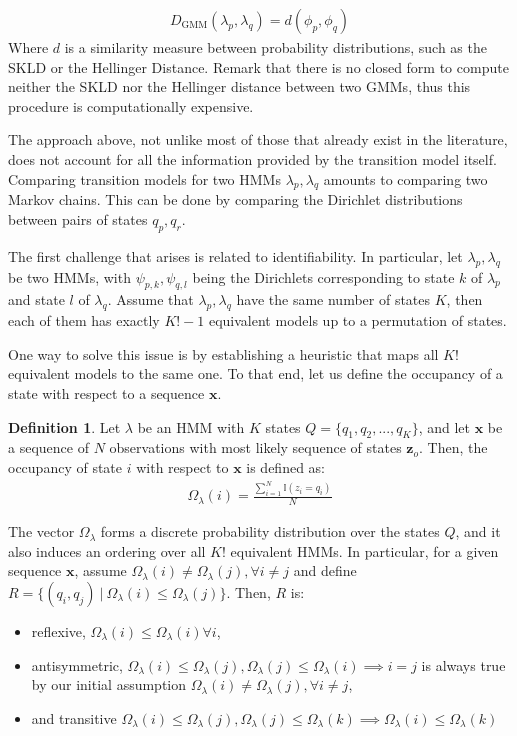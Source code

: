 \documentclass[pdftex,11pt,a4paper]{article}
\theoremstyle{definition}
\newtheorem{definition}{Definition}[section]
\theoremstyle{remark}
\newcommand*{\V}[1]{\mathbf{#1}}%
\newcommand\given[1][]{\:#1\vert\:}
\begin{document}
\begin{align*}
D_{\text{GMM}}(\lambda_p, \lambda_q) = d( \phi_p, \phi_q )
\end{align*}
Where $d$ is a similarity measure between probability distributions, such as the SKLD or the Hellinger Distance. Remark that there is no closed form to compute neither the SKLD nor the Hellinger distance between two GMMs, thus this procedure is computationally expensive.
\par The approach above, not unlike most of those that already exist in the literature, does not account for all the information provided by the transition model itself. Comparing transition models for two HMMs $\lambda_p, \lambda_q$ amounts to comparing two Markov chains. This can be done by comparing the Dirichlet distributions between pairs of states $q_p, q_r$. 
\par The first challenge that arises is related to identifiability. In particular, let $\lambda_p, \lambda_q$ be two HMMs, with $\psi_{p, k}, \psi_{q, l}$ being the Dirichlets corresponding to state $k$ of $\lambda_p$ and state $l$ of $\lambda_q$. Assume that $\lambda_p, \lambda_q$ have the same number of states $K$, then each of them has exactly $K!-1$ equivalent models up to a permutation of states. 
\par One way to solve this issue is by establishing a heuristic that maps all $K!$ equivalent models to the same one. To that end, let us define the occupancy of a state with respect to a sequence $\V{x}$. 
\begin{definition}\label{def_occupancy}
Let $\lambda$ be an HMM with $K$ states $Q = \{q_1, q_2, ..., q_K\}$, and let $\V{x}$ be a sequence of $N$ observations with most likely sequence of states $\V{z}_o$. Then, the occupancy of state $i$ with respect to $\V{x}$ is defined as:
\begin{align*}
\Omega_\lambda(i) = \frac{\sum_{i=1}^N\mathbb{I}(z_{i} = q_i)}{N}
\end{align*}
\end{definition}
\par The vector $\Omega_\lambda$ forms a discrete probability distribution over the states $Q$, and it also induces an ordering over all $K!$ equivalent HMMs. In particular, for a given sequence $\V{x}$, assume $\Omega_\lambda(i) \neq \Omega_\lambda(j), \forall i\neq j$ and define $R = \{(q_i, q_j) \given \Omega_\lambda(i) \leq \Omega_\lambda(j)\}$. Then, $R$ is:
\begin{itemize}
\item reflexive, $\Omega_\lambda(i) \leq \Omega_\lambda(i) \forall i$,
\item antisymmetric, $\Omega_\lambda(i) \leq \Omega_\lambda(j), \Omega_\lambda(j) \leq \Omega_\lambda(i) \implies i = j$ is always true by our initial assumption $\Omega_\lambda(i) \neq \Omega_\lambda(j), \forall i\neq j$,
\item and transitive $\Omega_\lambda(i) \leq \Omega_\lambda(j), \Omega_\lambda(j) \leq \Omega_\lambda(k) \implies \Omega_\lambda(i) \leq \Omega_\lambda(k)$
\end{itemize}
\end{document}
